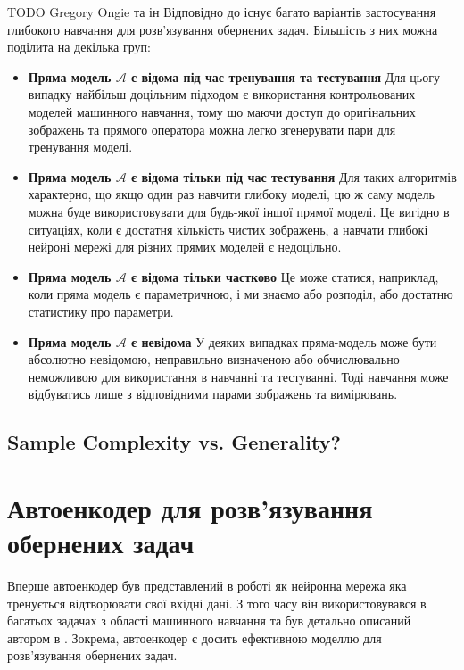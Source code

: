 \documentclass[14pt,a4paper]{extarticle}
\newcounter{e}
\numberwithin{equation}{section}
\numberwithin{figure}{section}
\begin{document}
	TODO Gregory Ongie та ін
	Відповідно до \cite{ongie2020deep} існує багато варіантів застосування глибокого навчання для розв'язування обернених задач. Більшість з них можна поділита на декілька груп:
	\begin{itemize}
		\item \textbf{Пряма модель $\mathcal{A}$ є відома під час тренування та тестування} \newline
		Для цьогу випадку найбільш доцільним підходом є використання контрольованих моделей машинного навчання, тому що маючи доступ до оригінальних зображень та прямого оператора можна легко згенерувати пари для тренування моделі.
				
		\item \textbf{Пряма модель $\mathcal{A}$ є відома тільки під час тестування} \newline
		Для таких алгоритмів характерно, що якщо один раз навчити глибоку моделі, цю ж саму модель можна буде використовувати для будь-якої іншої прямої моделі. Це вигідно в ситуаціях, коли є достатня кількість чистих зображень, а навчати глибокі нейроні мережі для різних прямих моделей є недоцільно.
		

		\item \textbf{Пряма модель $\mathcal{A}$ є відома тільки частково} \newline
		Це може статися, наприклад, коли пряма модель є параметричною, і ми знаємо або розподіл, або
		достатню статистику про параметри.

		\item \textbf{Пряма модель $\mathcal{A}$ є невідома} \newline
		У деяких випадках пряма-модель може бути абсолютно невідомою, неправильно визначеною або обчислювально неможливою для використання в навчанні та тестуванні. Тоді навчання може відбуватись лише з відповідними парами зображень та вимірювань. 
	\end{itemize}


	\subsection{Sample Complexity vs. Generality?}

	\newpage
	\thispagestyle{empty}
	\section{Автоенкодер для розв'язування обернених задач}

	Вперше автоенкодер був представлений в роботі \cite{10.5555/104279} як нейронна мережа яка тренується відтворювати свої вхідні дані. З того часу він використовувався в багатьох задачах з області машинного навчання та був детально описаний автором в \cite{Goodfellow-et-al-2016}. Зокрема, автоенкодер є досить ефективною моделлю для розв'язування обернених задач.
	
\end{document}
